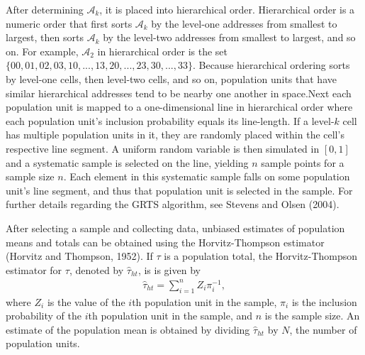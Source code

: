 \documentclass[]{elsarticle} %
\begin{document}
After determining \(\mathcal{A}_k\), it is placed into hierarchical
order. Hierarchical order is a numeric order that first sorts
\(\mathcal{A}_k\) by the level-one addresses from smallest to largest,
then sorts \(\mathcal{A}_k\) by the level-two addresses from smallest to
largest, and so on. For example, \(\mathcal{A}_2\) in hierarchical order
is the set
\(\{00, 01, 02, 03, 10, ..., 13, 20, ..., 23, 30, ..., 33\}\). Because
hierarchical ordering sorts by level-one cells, then level-two cells,
and so on, population units that have similar hierarchical addresses
tend to be nearby one another in space.Next each population unit is
mapped to a one-dimensional line in hierarchical order where each
population unit's inclusion probability equals its line-length. If a
level-\(k\) cell has multiple population units in it, they are randomly
placed within the cell's respective line segment. A uniform random
variable is then simulated in \([0, 1]\) and a systematic sample is
selected on the line, yielding \(n\) sample points for a sample size
\(n\). Each element in this systematic sample falls on some population
unit's line segment, and thus that population unit is selected in the
sample. For further details regarding the GRTS algorithm, see Stevens
and Olsen (2004).

After selecting a sample and collecting data, unbiased estimates of
population means and totals can be obtained using the Horvitz-Thompson
estimator (Horvitz and Thompson, 1952). If \(\tau\) is a population
total, the Horvitz-Thompson estimator for \(\tau\), denoted by
\(\hat{\tau}_{ht}\), is is given by \begin{align}\label{eq:ht}
  \hat{\tau}_{ht} = \sum_{i = 1}^n Z_i \pi_i^{-1},
\end{align} where \(Z_i\) is the value of the \(i\)th population unit in
the sample, \(\pi_i\) is the inclusion probability of the \(i\)th
population unit in the sample, and \(n\) is the sample size. An estimate
of the population mean is obtained by dividing \(\hat{\tau}_{ht}\) by
\(N\), the number of population units.
\end{document}
